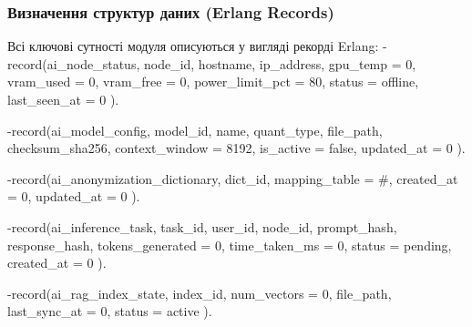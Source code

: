 \documentclass{article}
\let\originalfootnotesize\footnotesize
\let\oldverbatim\verbatim
\let\oldendverbatim\endverbatim
\renewenvironment{verbatim}{\originalfootnotesize\oldverbatim}{\oldendverbatim}
\begin{document}
\subsubsection{Визначення структур даних (Erlang Records)}
Всі ключові сутності модуля описуються у вигляді рекорді Erlang:
\begin{verbatim}
-record(ai_node_status, {
    node_id,                    % UUID вузла (PK)
    hostname,                   % Текстове ім'я хоста
    ip_address,                 % IP-адреса вузла
    gpu_temp = 0,               % Температура GPU RTX 4070 Ti в градусах
    vram_used = 0,              % Зайнято відеопам'яті (MB)
    vram_free = 0,              % Вільно відеопам'яті (MB)
    power_limit_pct = 80,       % Power Limit у відсотках (80% за замовчуванням)
    status = offline,           % online | offline | degraded | cooling_down
    last_seen_at = 0            % Timestamp останнього пінгу
}).

-record(ai_model_config, {
    model_id,                   % UUID моделі (PK)
    name,                       % Назва моделі (напр. Llama-3-8B-Instruct)
    quant_type,                 % Тип квантування (q4_k_m | q8_0)
    file_path,                  % Шлях до GGUF файлу на NVMe
    checksum_sha256,            % Контрольна сума файлу
    context_window = 8192,      % Максимальний контекст (токенів)
    is_active = false,          % Чи завантажена модель у пам'ять GPU
    updated_at = 0
}).

-record(ai_anonymization_dictionary, {
    dict_id,                    % UUID словника (PK)
    mapping_table = #{},        % Таблиця відповідностей {Token -> OriginalValue}
    created_at = 0,
    updated_at = 0
}).

-record(ai_inference_task, {
    task_id,                    % UUID задачі (PK)
    user_id,                    % UUID користувача, що надіслав запит
    node_id,                    % UUID обчислювального вузла, який виконав запит
    prompt_hash,                % SHA256 хеш промпту
    response_hash,              % SHA256 хеш згенерованої відповіді
    tokens_generated = 0,       % Кількість згенерованих токенів
    time_taken_ms = 0,          % Час виконання запиту в мілісекундах
    status = pending,           % pending | processing | completed | failed
    created_at = 0
}).

-record(ai_rag_index_state, {
    index_id,                   % UUID індексу (PK)
    num_vectors = 0,            % Кількість векторів
    file_path,                  % Шлях до FAISS HNSW індексу
    last_sync_at = 0,           % Час останньої синхронізації з Scality RING
    status = active             % active | syncing | stale
}).
\end{verbatim}
\end{document}
